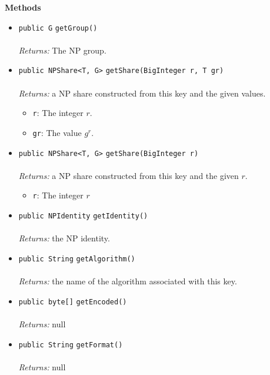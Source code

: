 \textbf{\sffamily Methods}
\begin{itemize}
\item \lstinline|public G| \lstinline|getGroup|\lstinline|()|\\ \\[-0.6em]
\emph{Returns:} The NP group.



\item \lstinline|public NPShare<T, G>| \lstinline|getShare|\lstinline|(BigInteger r, T gr)|\\ \\[-0.6em]
\emph{Returns:} a NP share constructed from this key and the given values.
\begin{itemize}
\item \lstinline|r|: The integer $r$.
\item \lstinline|gr|: The value $g^r$.
\end{itemize}



\item \lstinline|public NPShare<T, G>| \lstinline|getShare|\lstinline|(BigInteger r)|\\ \\[-0.6em]
\emph{Returns:} a NP share constructed from this key and the given $r$.
\begin{itemize}
\item \lstinline|r|: The integer $r$
\end{itemize}



\item \lstinline|public NPIdentity| \lstinline|getIdentity|\lstinline|()|\\ \\[-0.6em]
\emph{Returns:} the NP identity.



\item \lstinline|public String| \lstinline|getAlgorithm|\lstinline|()|\\ \\[-0.6em]
\emph{Returns:} the name of the algorithm associated with this key.



\item \lstinline|public byte[]| \lstinline|getEncoded|\lstinline|()|\\ \\[-0.6em]
\emph{Returns:} null



\item \lstinline|public String| \lstinline|getFormat|\lstinline|()|\\ \\[-0.6em]
\emph{Returns:} null



\end{itemize}


